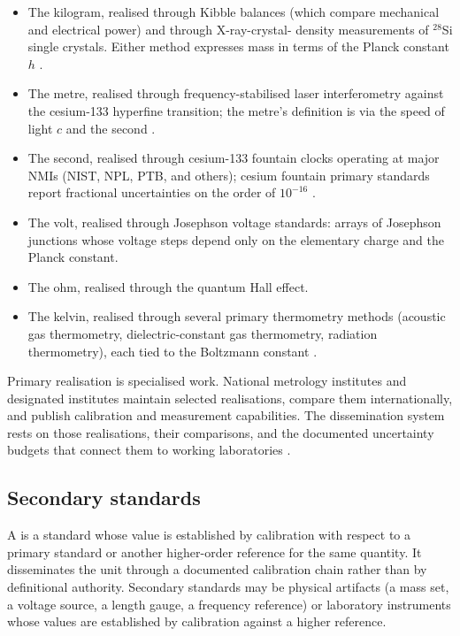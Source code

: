 \begin{itemize}[leftmargin=*]
  \item The kilogram, realised through Kibble balances (which compare
    mechanical and electrical power) and through X-ray-crystal-
    density measurements of $^{28}$Si single crystals. Either method
    expresses mass in terms of the Planck constant
    $h$ \cite{std:bipm-si2019, web:nist-kibble-balance}.
  \item The metre, realised through frequency-stabilised laser
    interferometry against the cesium-133 hyperfine transition; the
    metre's definition is via the speed of light $c$ and the second
    \cite{std:bipm-si2019}.
  \item The second, realised through cesium-133 fountain clocks
    operating at major NMIs (NIST, NPL, PTB, and others); cesium
    fountain primary standards report fractional uncertainties on
    the order of $10^{-16}$ \cite{web:nist-cesium-fountain}.
  \item The volt, realised through Josephson voltage standards: arrays
    of Josephson junctions whose voltage steps depend only on the
    elementary charge and the Planck constant.
  \item The ohm, realised through the quantum Hall effect.
  \item The kelvin, realised through several primary thermometry
    methods (acoustic gas thermometry, dielectric-constant gas
    thermometry, radiation thermometry), each tied to the Boltzmann
    constant \cite{std:bipm-si2019, web:bipm-cct-its90}.
\end{itemize}

Primary realisation is specialised work. National metrology
institutes and designated institutes maintain selected realisations,
compare them internationally, and publish calibration and measurement
capabilities. The dissemination system rests on those realisations,
their comparisons, and the documented uncertainty budgets that
connect them to working laboratories \cite{std:bipm-cipm-mra}.

\subsection{Secondary standards}

A  is a standard whose value is
established by calibration with respect to a primary standard or
another higher-order reference for the same quantity. It
disseminates the unit through a documented calibration chain rather
than by definitional authority. Secondary standards may be physical
artifacts (a mass set, a voltage source, a length gauge, a frequency
reference) or laboratory instruments whose values are established by
calibration against a higher reference.

